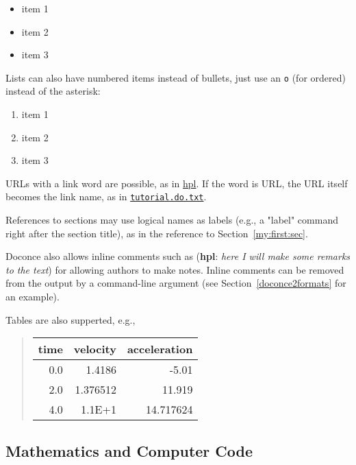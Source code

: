 \documentclass[%
oneside,                 %
final,                   %
10pt]{article}
\newcommand{\inlinecomment}[2]{  ({\bf #1}: \emph{#2})  }
\begin{document}
\begin{itemize}
  \item item 1

  \item item 2

  \item item 3
\end{itemize}

\noindent
Lists can also have numbered items instead of bullets, just use an {\fontsize{10pt}{10pt}\Verb!o!}
(for ordered) instead of the asterisk:

\begin{enumerate}
 \item item 1

 \item item 2

 \item item 3
\end{enumerate}

\noindent
URLs with a link word are possible, as in \href{{http://folk.uio.no/hpl}}{hpl}.
If the word is URL, the URL itself becomes the link name,
as in \href{{tutorial.do.txt}}{\nolinkurl{tutorial.do.txt}}.

References to sections may use logical names as labels (e.g., a
"label" command right after the section title), as in the reference to
Section~\ref{my:first:sec}.

Doconce also allows inline comments such as \inlinecomment{hpl}{here I will make
some remarks to the text} for allowing authors to make notes. Inline
comments can be removed from the output by a command-line argument
(see Section~\ref{doconce2formats} for an example).

Tables are also supperted, e.g.,


\begin{quote}\begin{tabular}{rrr}
\hline
\multicolumn{1}{c}{ time } & \multicolumn{1}{c}{ velocity } & \multicolumn{1}{c}{ acceleration } \\
\hline
0.0          & 1.4186       & -5.01        \\
2.0          & 1.376512     & 11.919       \\
4.0          & 1.1E+1       & 14.717624    \\
\hline
\end{tabular}\end{quote}

\noindent

\subsection{Mathematics and Computer Code}
\end{document}
